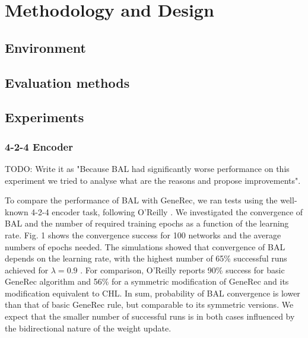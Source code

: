 
\section{Methodology and Design}

\subsection{Environment} 

\subsection{Evaluation methods} 

\subsection{Experiments}  

\subsubsection{4-2-4 Encoder} 

TODO: Write it as "Because BAL had significantly worse performance on this experiment we tried to analyse what are the reasons and propose improvements". 

To compare the performance of BAL with GeneRec, we ran tests using the well-
known 4-2-4 encoder task, following O’Reilly \cite{o1996bio}. We investigated the convergence
of BAL and the number of required training epochs as a function of the learning
rate. Fig. 1 shows the convergence success for 100 networks and the average
numbers of epochs needed. The simulations showed that convergence of BAL
depends on the learning rate, with the highest number of 65\% successful runs
achieved for $\lambda = 0.9$ \cite{farkas2013bal}. For comparison, O’Reilly \cite{o1996bio} reports 90\% success for basic GeneRec algorithm and 56\% for a symmetric modification of GeneRec and its
modification equivalent to CHL. In sum, probability of BAL convergence is lower
than that of basic GeneRec rule, but comparable to its symmetric versions. We
expect that the smaller number of successful runs is in both cases influenced by
the bidirectional nature of the weight update.

